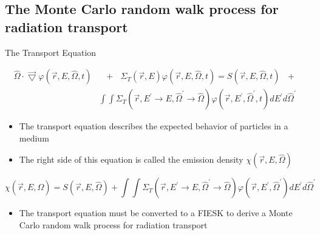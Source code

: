 \documentclass{beamer}
\begin{document}

\subsection{The Monte Carlo random walk process for radiation transport}
\begin{frame}{The Transport Equation}

\begin{align}
  \hat{\Omega} \cdot \vec{\bigtriangledown} \varphi(\vec{r},E,\hat{\Omega},t)
    &\text{ }+\text{ } \Sigma_T(\vec{r},E) \varphi(\vec{r},E,\hat{\Omega},t) = 
    S(\vec{r},E,\hat{\Omega},t) \text{ }+\text{ } \nonumber \\
    & \int\int \Sigma_T(\vec{r},E^{'} \to E,\hat{\Omega}^{'} \to \hat{\Omega})
    \varphi(\vec{r},E^{'},\hat{\Omega}^{'},t) dE^{'}d\hat{\Omega}^{'} \nonumber
\end{align}

  \begin{itemize}
    \item The transport equation describes the expected behavior of particles
      in a medium
      \medskip
    \item The right side of this equation is called the emission density 
      $\chi(\vec{r},E,\hat{\Omega})$
  \end{itemize}
  \medskip
  \begin{equation*}
    \chi(\vec{r},E,\hat{\Omega}) = S(\vec{r},E,\hat{\Omega}) +
    \int\int \Sigma_T(\vec{r},E^{'} \to E,\hat{\Omega}^{'} \to \hat{\Omega})
    \varphi(\vec{r},E^{'},\hat{\Omega}^{'}) dE^{'}d\hat{\Omega}^{'}
  \end{equation*}
  
  \begin{itemize}
    \item The transport equation must be converted to a FIESK to derive a 
      Monte Carlo random walk process for radiation transport
  \end{itemize}

\end{frame}

\end{document}
